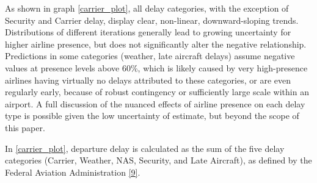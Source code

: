 \documentclass{article} %
\begin{document}
As shown in graph \autoref{carrier_plot}, all delay categories, with the exception of Security and Carrier delay, display clear, non-linear, downward-sloping trends. Distributions of different iterations generally lead to growing uncertainty for higher airline presence, but does not significantly alter the negative relationship. Predictions in some categories (weather, late aircraft delays) assume negative values at presence levels above 60\%, which is likely caused by very high-presence airlines having virtually no delays attributed to these categories, or are even regularly early, because of robust contingency or sufficiently large scale within an airport. A full discussion of the nuanced effects of airline presence on each delay type is possible given the low uncertainty of estimate, but beyond the scope of this paper. 

In \autoref{carrier_plot}, departure delay is calculated as the sum of the five delay categories (Carrier, Weather, NAS, Security, and Late Aircraft), as defined by the Federal Aviation Administration \hyperlink{Ref9}{[9]}. 
\end{document}

